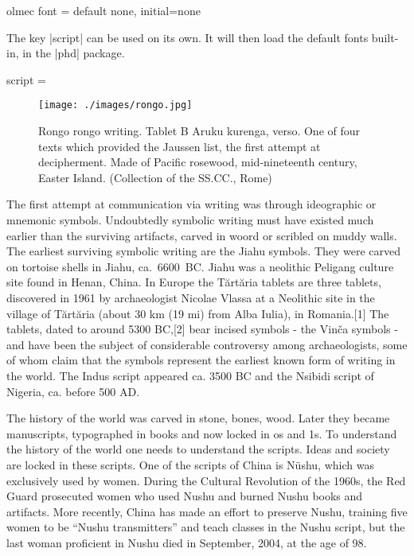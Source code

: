 \def\olmecfontstore{}

\cxset{olmec font/.store in=\olmecfontstore}


\begin{docKey}[phd]{olmec font}{ = } {default none, initial=none}
\end{docKey}

The key |script| can be used on its own. It will then load the default fonts built-in, in the |phd| package.


\begin{docKey}[phd]{script =}{ }{}
\end{docKey}

\begin{figure}[b]
\centering
\texttt{[image: ./images/rongo.jpg]}
\caption{Rongo rongo writing. Tablet B Aruku kurenga, verso. One of four texts which provided the Jaussen list, the first attempt at decipherment. Made of Pacific rosewood, mid-nineteenth century, Easter Island.
(Collection of the SS.CC., Rome)}

\end{figure}

The first attempt  at communication via writing was through ideographic or mnemonic symbols. Undoubtedly symbolic writing must have existed much earlier than the surviving artifacts, carved in woord or scribled on muddy walls. The earliest surviving symbolic writing are the Jiahu symbols. They were carved on tortoise shells in Jiahu, ca.~6600~BC. Jiahu was a neolithic Peligang culture site found in Henan, China. In Europe the Tărtăria tablets are three tablets, discovered in 1961 by archaeologist Nicolae Vlassa at a Neolithic site in the village of Tărtăria (about 30 km (19 mi) from Alba Iulia), in Romania.[1] The tablets, dated to around 5300 BC,[2] bear incised symbols - the Vinča symbols - and have been the subject of considerable controversy among archaeologists, some of whom claim that the symbols represent the earliest known form of writing in the world. The Indus script appeared ca. 3500 BC and the Nsibidi script of Nigeria, ca. before 500 AD. 

The history of the world was carved in stone, bones, wood. Later they became manuscripts, typographed in books and now locked in os and 1s. To understand the history of the world one needs to understand the scripts. Ideas and society are locked in these scripts. One of the scripts of China is Nüshu, which was exclusively used by women.  During the Cultural Revolution of the 1960s, the Red Guard prosecuted women who used Nushu and burned Nushu books and artifacts. More recently, China has made an effort to preserve Nushu, training five women to be “Nushu transmitters” and teach classes in the Nushu script, but the last woman proficient in Nushu died in September, 2004, at the age of 98.

